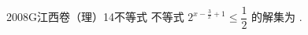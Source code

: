 
\begin{problem}{2008}{G}{江西卷（理）}{14}{不等式}
不等式 $ 2^{x - \frac{3}{x} + 1} \leqslant \dfrac{1}{2} $ 的解集为 \underline{\hspace{4em}}.
\end{problem}

\begin{answer}

\end{answer}

\begin{solutions}

\end{solutions}
